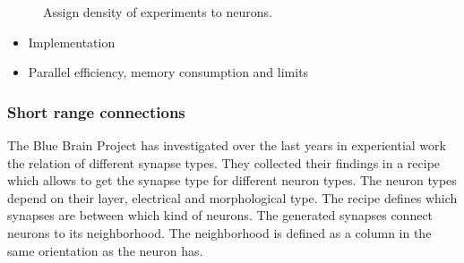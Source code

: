 \documentclass[a4paper]{article}
\begin{document}
\begin{figure}[ht!]
   	\begin{center}
        \hspace{0.5cm}
       \hspace{0.5cm}
        \hspace{0.5cm}
    \end{center}
    	\caption{%
        Assign density of experiments to neurons.
     }%
   \label{fig:atlas}
   \end{figure}
   
   \begin{itemize}
      \item Implementation
      \item Parallel efficiency, memory consumption and limits
   \end{itemize}
   
\subsubsection{Short range connections}
The Blue Brain Project has investigated over the last years in experiential work the relation of different synapse types.
They collected their findings in a recipe which allows to get the synapse type for different neuron types.
The neuron types depend on their layer, electrical and morphological type. The recipe defines which synapses are between 
which kind of neurons. The generated synapses connect neurons to its neighborhood. The neighborhood is defined as a
column in the same orientation as the neuron has.
\end{document}
